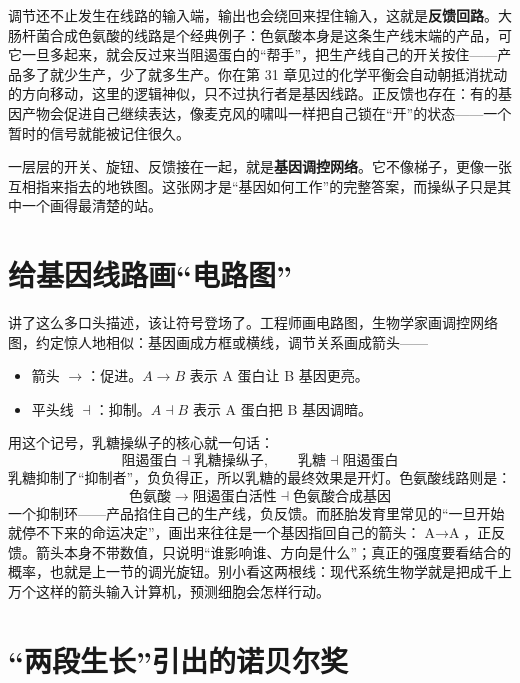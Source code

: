 调节还不止发生在线路的输入端，输出也会绕回来捏住输入，这就是\textbf{反馈回路}。大肠杆菌合成色氨酸的线路是个经典例子：色氨酸本身是这条生产线末端的产品，可它一旦多起来，就会反过来当阻遏蛋白的“帮手”，把生产线自己的开关按住——产品多了就少生产，少了就多生产。你在第 31 章见过的化学平衡会自动朝抵消扰动的方向移动，这里的逻辑神似，只不过执行者是基因线路。正反馈也存在：有的基因产物会促进自己继续表达，像麦克风的啸叫一样把自己锁在“开”的状态——一个暂时的信号就能被记住很久。

一层层的开关、旋钮、反馈接在一起，就是\textbf{基因调控网络}。它不像梯子，更像一张互相指来指去的地铁图。这张网才是“基因如何工作”的完整答案，而操纵子只是其中一个画得最清楚的站。

\section{给基因线路画“电路图”}

讲了这么多口头描述，该让符号登场了。工程师画电路图，生物学家画调控网络图，约定惊人地相似：基因画成方框或横线，调节关系画成箭头——

\begin{itemize}[itemsep=2pt]
\item 箭头 $\rightarrow$：促进。$A \rightarrow B$ 表示 A 蛋白让 B 基因更亮。
\item 平头线 $\dashv$：抑制。$A \dashv B$ 表示 A 蛋白把 B 基因调暗。
\end{itemize}

用这个记号，乳糖操纵子的核心就一句话：
\[
\text{阻遏蛋白} \dashv \text{乳糖操纵子}, \qquad \text{乳糖} \dashv \text{阻遏蛋白}
\]
乳糖抑制了“抑制者”，负负得正，所以乳糖的最终效果是开灯。色氨酸线路则是：
\[
\text{色氨酸} \rightarrow \text{阻遏蛋白活性} \dashv \text{色氨酸合成基因}
\]
一个抑制环——产品掐住自己的生产线，负反馈。而胚胎发育里常见的“一旦开始就停不下来的命运决定”，画出来往往是一个基因指回自己的箭头：$\text{A} \rightarrow \text{A}$，正反馈。箭头本身不带数值，只说明“谁影响谁、方向是什么”；真正的强度要看结合的概率，也就是上一节的调光旋钮。别小看这两根线：现代系统生物学就是把成千上万个这样的箭头输入计算机，预测细胞会怎样行动。

\section{“两段生长”引出的诺贝尔奖}

